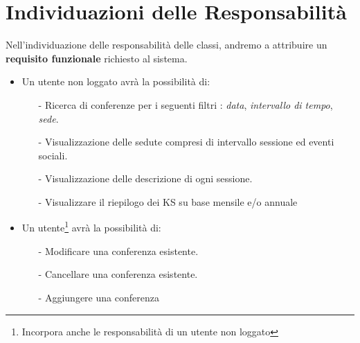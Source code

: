 \documentclass[a4paper,italian,10pt,openany]{book}
\begin{document}
	\section{Individuazioni delle Responsabilità}
	Nell'individuazione delle responsabilità delle classi, andremo a attribuire un \textbf{requisito funzionale} richiesto al sistema.
\begin{itemize}
\item Un utente non loggato avrà la possibilità di:
	\begin{itemize}
	\item[-] Ricerca di conferenze per i seguenti filtri : \textit{data},  \textit{intervallo di tempo}, \textit{sede}.
	\item[-] Visualizzazione delle sedute compresi di intervallo sessione ed eventi sociali.
	\item[-] Visualizzazione delle descrizione di ogni sessione.
	\item[-] Visualizzare il riepilogo dei KS su base mensile e/o annuale
	\end{itemize}
\item Un utente\footnote{Incorpora anche le responsabilità di un utente non loggato} avrà la possibilità di:
	\begin{itemize}
	\item[-] Modificare una conferenza esistente.
	\item[-] Cancellare una conferenza esistente.
	\item[-] Aggiungere una conferenza
	\end{itemize}
\end{itemize}
\let\cleardoublepage\clearpage
\end{document}
